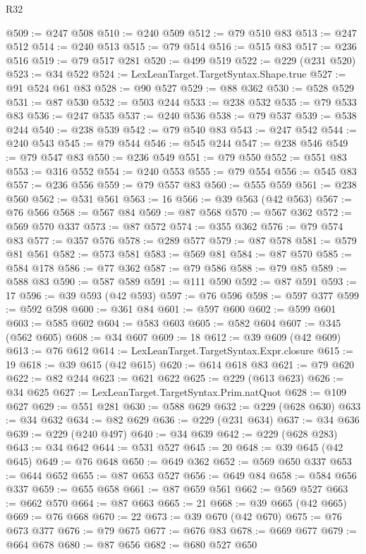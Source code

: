 \begin{lexlean}{R32}
\begin{coremodule}
@509 := @247 @508
@510 := @240 @509
@512 := @79 @510 @83
@513 := @247 @512
@514 := @240 @513
@515 := @79 @514
@516 := @515 @83
@517 := @236 @516
@519 := @79 @517 @281
@520 := @499 @519
@522 := @229 (@231 @520)
@523 := @34 @522
@524 := LexLeanTarget.TargetSyntax.Shape.true
@527 := @91 @524 @61 @83
@528 := @90 @527
@529 := @88 @362
@530 := @528 @529
@531 := @87 @530
@532 := @503 @244
@533 := @238 @532
@535 := @79 @533 @83
@536 := @247 @535
@537 := @240 @536
@538 := @79 @537
@539 := @538 @244
@540 := @238 @539
@542 := @79 @540 @83
@543 := @247 @542
@544 := @240 @543
@545 := @79 @544
@546 := @545 @244
@547 := @238 @546
@549 := @79 @547 @83
@550 := @236 @549
@551 := @79 @550
@552 := @551 @83
@553 := @316 @552
@554 := @240 @553
@555 := @79 @554
@556 := @545 @83
@557 := @236 @556
@559 := @79 @557 @83
@560 := @555 @559
@561 := @238 @560
@562 := @531 @561
@563 := 16
@566 := @39 @563 (@42 @563)
@567 := @76 @566
@568 := @567 @84
@569 := @87 @568
@570 := @567 @362
@572 := @569 @570 @337
@573 := @87 @572
@574 := @355 @362
@576 := @79 @574 @83
@577 := @357 @576
@578 := @289 @577
@579 := @87 @578
@581 := @579 @81 @561
@582 := @573 @581
@583 := @569 @81
@584 := @87 @570
@585 := @584 @178
@586 := @77 @362
@587 := @79 @586
@588 := @79 @85
@589 := @588 @83
@590 := @587 @589
@591 := @111 @590
@592 := @87 @591
@593 := 17
@596 := @39 @593 (@42 @593)
@597 := @76 @596
@598 := @597 @377
@599 := @592 @598
@600 := @361 @84
@601 := @597 @600
@602 := @599 @601
@603 := @585 @602
@604 := @583 @603
@605 := @582 @604
@607 := @345 (@562 @605)
@608 := @34 @607
@609 := 18
@612 := @39 @609 (@42 @609)
@613 := @76 @612
@614 := LexLeanTarget.TargetSyntax.Expr.closure
@615 := 19
@618 := @39 @615 (@42 @615)
@620 := @614 @618 @83
@621 := @79 @620
@622 := @82 @244
@623 := @621 @622
@625 := @229 (@613 @623)
@626 := @34 @625
@627 := LexLeanTarget.TargetSyntax.Prim.natQuot
@628 := @109 @627
@629 := @551 @281
@630 := @588 @629
@632 := @229 (@628 @630)
@633 := @34 @632
@634 := @82 @629
@636 := @229 (@231 @634)
@637 := @34 @636
@639 := @229 (@240 @497)
@640 := @34 @639
@642 := @229 (@628 @283)
@643 := @34 @642
@644 := @531 @527
@645 := 20
@648 := @39 @645 (@42 @645)
@649 := @76 @648
@650 := @649 @362
@652 := @569 @650 @337
@653 := @644 @652
@655 := @87 @653 @527
@656 := @649 @84
@658 := @584 @656 @337
@659 := @655 @658
@661 := @87 @659 @561
@662 := @569 @527
@663 := @662 @570
@664 := @87 @663
@665 := 21
@668 := @39 @665 (@42 @665)
@669 := @76 @668
@670 := 22
@673 := @39 @670 (@42 @670)
@675 := @76 @673 @377
@676 := @79 @675
@677 := @676 @83
@678 := @669 @677
@679 := @664 @678
@680 := @87 @656
@682 := @680 @527 @650

\end{coremodule}
\end{lexlean}
